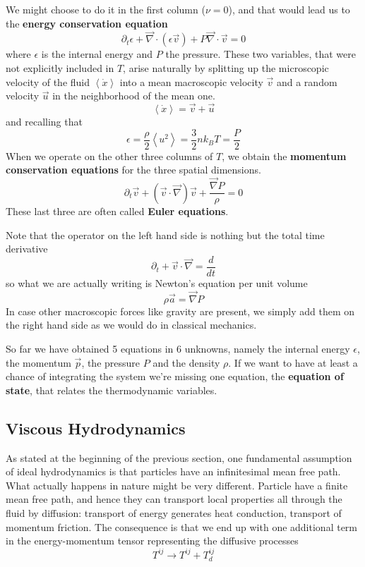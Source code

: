 We might choose to do it in the first column ($\nu=0$), and that would lead us to the \textbf{energy conservation equation}
\begin{equation} \label{consen}
\partial_t \epsilon + \vec \nabla \cdot (\epsilon \vec{v}) + P\vec \nabla \cdot \vec{v}=0
\end{equation}
where $\epsilon$ is the internal energy and $P$ the pressure. These two variables, that were not explicitly included in $T$, arise naturally by splitting up the microscopic velocity of the fluid $\left <  \dot{x} \right >$ into a mean macroscopic velocity $\vec{v}$ and a random velocity $\vec{u}$ in the neighborhood of the mean one. 
$$\left <  \dot{x} \right >= \vec{v}  +  \vec{u} $$
and recalling that 
$$\epsilon = \frac{\rho}{2} \left <  u^2 \right > = \frac{3}{2} n k_B T= \frac{P}{2}$$
When we operate on the other three columns of $T$, we obtain the \textbf{momentum conservation equations} for the three spatial dimensions.
\begin{equation} \label{euler}
\partial_t \vec{v} + (\vec{v} \cdot \vec \nabla) \vec{v} + \frac{\vec \nabla P}{\rho}=0
\end{equation}
These last three are often called \textbf{Euler equations}. 

Note that the operator on the left hand side is nothing but the total time derivative
$$
\partial_t + \vec{v} \cdot \vec \nabla = \frac{d}{dt}
$$
so what we are actually writing is Newton's equation per unit volume
$$
\rho \vec{a} = \vec \nabla P
$$
In case other macroscopic forces like gravity are present, we simply add them on the right hand side as we would do in classical mechanics. 

So far we have obtained 5 equations in 6 unknowns, namely the internal energy $\epsilon$, the momentum $\vec{p}$, the pressure $P$ and the density $\rho$. If we want to have at least a chance of integrating the system we're missing one equation, the \textbf{equation of state}, that relates the thermodynamic variables.

\subsection{Viscous Hydrodynamics}

As stated at the beginning of the previous section, one fundamental assumption of ideal hydrodynamics is that particles have an infinitesimal mean free path. What actually happens in nature might be very different. Particle have a finite mean free path, and hence they can transport local properties all through the fluid by diffusion: transport of energy generates heat conduction, transport of momentum friction. The consequence is that we end up with one additional term in the energy-momentum tensor representing the diffusive processes
$$
T^{ij} \to T^{ij} + T^{ij}_d 
$$

